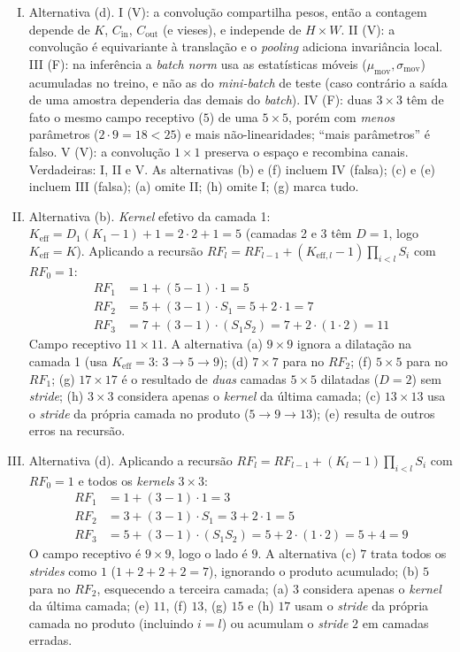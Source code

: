 \documentclass{dlproblemset}
\begin{document}
\begin{enumerate}[I)]
\item Alternativa (d). I (V): a convolução compartilha pesos, então a contagem depende de $K$, $C_{\text{in}}$, $C_{\text{out}}$ (e vieses), e independe de $H\times W$. II (V): a convolução é equivariante à translação e o \textit{pooling} adiciona invariância local. III (F): na inferência a \textit{batch norm} usa as estatísticas móveis ($\mu_{\text{mov}}, \sigma_{\text{mov}}$) acumuladas no treino, e não as do \textit{mini-batch} de teste (caso contrário a saída de uma amostra dependeria das demais do \textit{batch}). IV (F): duas $3\times 3$ têm de fato o mesmo campo receptivo ($5$) de uma $5\times 5$, porém com \emph{menos} parâmetros ($2\cdot 9 = 18 < 25$) e mais não-linearidades; ``mais parâmetros'' é falso. V (V): a convolução $1\times 1$ preserva o espaço e recombina canais. Verdadeiras: I, II e V. As alternativas (b) e (f) incluem IV (falsa); (c) e (e) incluem III (falsa); (a) omite II; (h) omite I; (g) marca tudo. %

\item Alternativa (b). \textit{Kernel} efetivo da camada 1: $K_{\text{eff}} = D_1(K_1 - 1) + 1 = 2\cdot 2 + 1 = 5$ (camadas 2 e 3 têm $D = 1$, logo $K_{\text{eff}} = K$). Aplicando a recursão $RF_l = RF_{l-1} + (K_{\text{eff},l} - 1)\prod_{i<l} S_i$ com $RF_0 = 1$:
\begin{align*}
    RF_1 &= 1 + (5 - 1)\cdot 1 = 5 \\
    RF_2 &= 5 + (3 - 1)\cdot S_1 = 5 + 2\cdot 1 = 7 \\
    RF_3 &= 7 + (3 - 1)\cdot (S_1 S_2) = 7 + 2\cdot(1\cdot 2) = 11
\end{align*}
Campo receptivo $11 \times 11$. A alternativa (a) $9 \times 9$ ignora a dilatação na camada 1 (usa $K_{\text{eff}} = 3$: $3 \to 5 \to 9$); (d) $7 \times 7$ para no $RF_2$; (f) $5 \times 5$ para no $RF_1$; (g) $17 \times 17$ é o resultado de \emph{duas} camadas $5\times 5$ dilatadas ($D=2$) sem \textit{stride}; (h) $3 \times 3$ considera apenas o \textit{kernel} da última camada; (c) $13 \times 13$ usa o \textit{stride} da própria camada no produto ($5 \to 9 \to 13$); (e) resulta de outros erros na recursão. %

\item Alternativa (d). Aplicando a recursão $RF_l = RF_{l-1} + (K_l - 1)\prod_{i<l} S_i$ com $RF_0 = 1$ e todos os \textit{kernels} $3\times 3$:
\begin{align*}
    RF_1 &= 1 + (3-1)\cdot 1 = 3 \\
    RF_2 &= 3 + (3-1)\cdot S_1 = 3 + 2\cdot 1 = 5 \\
    RF_3 &= 5 + (3-1)\cdot (S_1 S_2) = 5 + 2\cdot(1\cdot 2) = 5 + 4 = 9
\end{align*}
O campo receptivo é $9 \times 9$, logo o lado é $9$. A alternativa (c) $7$ trata todos os \textit{strides} como $1$ ($1 + 2 + 2 + 2 = 7$), ignorando o produto acumulado; (b) $5$ para no $RF_2$, esquecendo a terceira camada; (a) $3$ considera apenas o \textit{kernel} da última camada; (e) $11$, (f) $13$, (g) $15$ e (h) $17$ usam o \textit{stride} da própria camada no produto (incluindo $i = l$) ou acumulam o \textit{stride} $2$ em camadas erradas. %


\end{enumerate}
\end{document}
